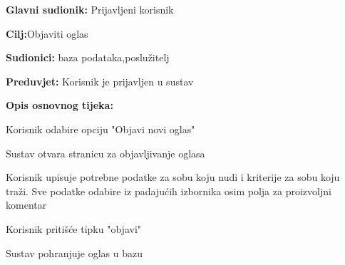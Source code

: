 \noindent {}
\begin{packed_item}
	
	\item \textbf{Glavni sudionik: }Prijavljeni korisnik
	\item  \textbf{Cilj:}Objaviti oglas
	\item  \textbf{Sudionici:} baza podataka,poslužitelj
	\item  \textbf{Preduvjet:} Korisnik je prijavljen u sustav
	\item  \textbf{Opis osnovnog tijeka:}
	
	\item[] \begin{packed_enum}
		
		\item Korisnik odabire opciju "Objavi novi oglas"
		\item Sustav otvara stranicu za objavljivanje oglasa
		\item Korisnik upisuje potrebne podatke za sobu koju nudi i kriterije za sobu koju traži. Sve podatke odabire iz padajućih izbornika osim polja za proizvoljni komentar
		\item Korisnik pritišće tipku "objavi" 
		\item Sustav pohranjuje oglas u bazu
	\end{packed_enum}
	
\end{packed_item}

